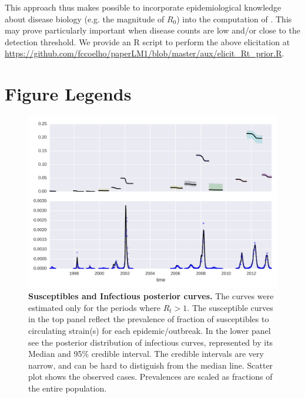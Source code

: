 This approach thus makes possible to incorporate epidemiological knowledge 
about disease biology (e.g. the magnitude of $R_0$) into the computation of \rr.
This may prove particularly important when disease counts are low and/or close 
to the detection threshold.
We provide an R script to perform the above elicitation at 
\url{https://github.com/fccoelho/paperLM1/blob/master/aux/elicit_Rt_prior.R}.


\section*{Figure Legends}
%
\begin{figure}
\begin{center}
\includegraphics[width=\textwidth]{plots/concat_SI.png}
\end{center}
\caption{
{\bf Susceptibles and Infectious posterior curves.}  The curves were estimated 
only for the periods where $R_t> 1$.  The susceptible curves in the top panel 
reflect the prevalence of fraction of susceptibles to circulating strain(s) for 
each epidemic/outbreak. In the lower panel see the posterior distribution 
of infectious curves, represented by its Median and 95\% credible interval. The 
credible intervals are very narrow, and can be hard to distiguish from the 
median line. 
Scatter plot shows the observed cases. Prevalences are scaled as fractions 
of the entire population.
}
\label{Fig:S0}
\end{figure}



